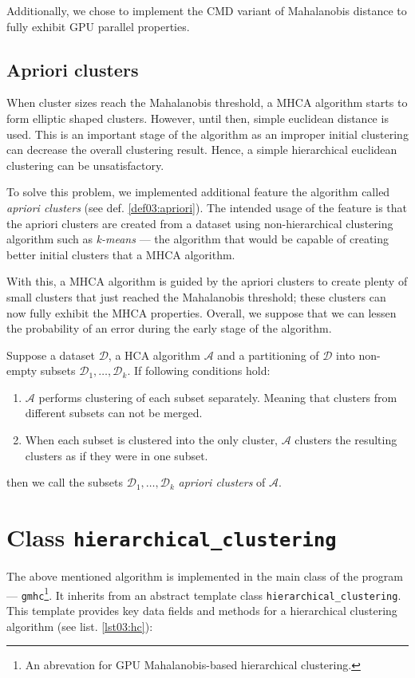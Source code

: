 Additionally, we chose to implement the CMD variant of Mahalanobis distance to fully exhibit GPU parallel properties.

\subsection{Apriori clusters}

When cluster sizes reach the Mahalanobis threshold, a MHCA algorithm starts to form elliptic shaped clusters. However, until then, simple euclidean distance is used. This is an important stage of the algorithm as an improper initial clustering can decrease the overall clustering result. Hence, a simple hierarchical euclidean clustering can be unsatisfactory.

To solve this problem, we implemented additional feature  the algorithm called \emph{apriori clusters} (see def. \ref{def03:apriori}). The intended usage of the feature is that the apriori clusters are created from a dataset using non-hierarchical clustering algorithm such as \emph{k-means} --- the algorithm that would be capable of creating better initial clusters that a MHCA algorithm. 

With this, a MHCA algorithm is guided by the apriori clusters to create plenty of small clusters that just reached the Mahalanobis threshold; these clusters can now fully exhibit the MHCA properties. Overall, we suppose that we can lessen the probability of an error during the early stage of the algorithm.

\begin{defn}[???]
	Suppose a dataset $\mathcal{D}$, a HCA algorithm $\mathcal{A}$ and a partitioning of  $\mathcal{D}$ into non-empty subsets $\mathcal{D}_1,\dots,\mathcal{D}_k$. If following conditions hold:
	\begin{enumerate}
		\item $\mathcal{A}$ performs clustering of each subset separately. Meaning that clusters from different subsets can not be merged.
		\item When each subset is clustered into the only cluster, $\mathcal{A}$ clusters the resulting clusters as if they were in one subset.
	\end{enumerate}
	then we call the subsets $\mathcal{D}_1,\dots,\mathcal{D}_k$ \emph{apriori clusters} of $\mathcal{A}$.
	\label{def03:apriori}
\end{defn}



\section{Class \texttt{hierarchical\_clustering}}
The above mentioned algorithm is implemented in the main class of the program --- \texttt{gmhc}\footnote{An abrevation for GPU Mahalanobis-based hierarchical clustering.}. It inherits from an abstract template class \texttt{hierarchical\_clustering}.
This template provides key data fields and methods for a hierarchical clustering algorithm (see list. \ref{lst03:hc}): 

